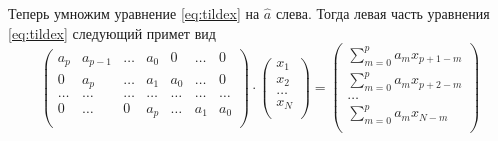\documentclass[a4paper,14pt]{extarticle}
\begin{document}
Теперь умножим уравнение \eqref{eq:tildex} на $\hat a$ слева.
Тогда левая часть уравнения \eqref{eq:tildex} следующий примет вид
\begin{equation}
    \begin{pmatrix}
        a_p & a_{p-1} & \dots & a_0 & 0 & \dots & 0 \\
        0  & a_{p} & \dots & a_1 & a_0 & \dots & 0 \\
        \dots & \dots & \dots & \dots & \dots & \dots & \dots\\
        0  & \dots &  0  & a_p & \dots  & a_1 & a_{0} \\
    \end{pmatrix}
    \cdot 
    \begin{pmatrix}
        x_1 \\ 
        x_2 \\ 
        \dots \\ 
        x_N \\ 
    \end{pmatrix}
    =
    \begin{pmatrix}
        \sum\limits_{m=0}^{p} a_m x_{p+1-m} \\ 
        \sum\limits_{m=0}^{p} a_m x_{p+2-m} \\ 
        \dots \\ 
        \sum\limits_{m=0}^{p} a_m x_{N-m} \\ 
    \end{pmatrix}
\end{equation}
\end{document}
